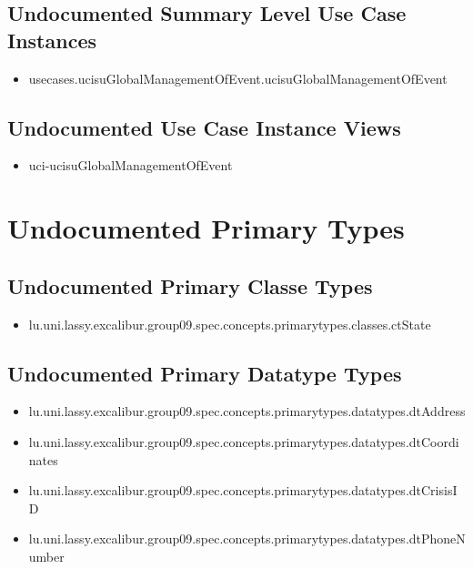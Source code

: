 \subsection[Undocumented Use Case Instances - Summary Level]{Undocumented Summary Level Use Case Instances}
\begin{itemize}
\item usecases.ucisuGlobalManagementOfEvent.ucisuGlobalManagementOfEvent 
\end{itemize}



\subsection[Undocumented Use Case Instance Views]{Undocumented Use Case Instance Views}
\begin{itemize}
\item uci-ucisuGlobalManagementOfEvent 
\end{itemize}






\section[Undocumented Primary Types]{Undocumented Primary Types}

\subsection[Undocumented Primary Classe Types]{Undocumented Primary Classe Types}
\begin{itemize}
\item lu.uni.lassy.excalibur.group09.spec.concepts.primarytypes.classes.ctState 
\end{itemize}

\subsection[Undocumented Primary Datatype Types]{Undocumented Primary Datatype Types}
\begin{itemize}
\item lu.uni.lassy.excalibur.group09.spec.concepts.primarytypes.datatypes.dtAddress 
\item lu.uni.lassy.excalibur.group09.spec.concepts.primarytypes.datatypes.dtCoordinates 
\item lu.uni.lassy.excalibur.group09.spec.concepts.primarytypes.datatypes.dtCrisisID 
\item lu.uni.lassy.excalibur.group09.spec.concepts.primarytypes.datatypes.dtPhoneNumber 
\end{itemize}

